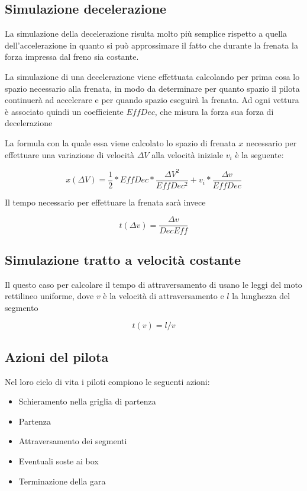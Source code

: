\documentclass[a4paper,11pt, twoside]{book}
\begin{document}
      \subsection{Simulazione decelerazione}
	La simulazione della decelerazione risulta molto più semplice rispetto a quella dell'accelerazione in quanto
	si può approssimare il fatto che durante la frenata la forza impressa dal freno sia costante.
	
        La simulazione di una decelerazione viene effettuata calcolando per prima cosa lo spazio necessario alla frenata,
	in modo da determinare per quanto spazio il pilota continuerà ad accelerare e per quando spazio 
	eseguirà la frenata. Ad ogni vettura è associato quindi
	un coefficiente $EffDec$, che misura la forza sua forza di decelerazione
	
	La formula con la quale essa viene calcolato lo spazio di frenata $x$ necessario per effettuare una variazione 
	di velocità $\Delta V$ alla velocità iniziale $v_i$ è la seguente:
	
	$$x(\Delta V)=\frac{1}{2}*EffDec*\frac{\Delta V^2}{EffDec^2}+v_i*\frac{\Delta v}{EffDec}$$
	
	Il tempo necessario per effettuare la frenata sarà invece
	
	$$t(\Delta v) = \frac{\Delta v}{DecEff}$$

		
      \subsection{Simulazione tratto a velocità costante}
        
        Il questo caso per calcolare il tempo di attraversamento di usano le leggi del moto rettilineo uniforme,
	dove $v$ è la velocità di attraversamento e $l$ la lunghezza del segmento
	
	$$t(v)=l/v$$
	
      \subsection{Azioni del pilota}
      \label{Azioni del pilota}
        Nel loro ciclo di vita i piloti compiono le seguenti azioni:
	
	\begin{itemize}
	  \item Schieramento nella griglia di partenza
	  \item Partenza
	  \item Attraversamento dei segmenti
	  \item Eventuali soste ai box
	  \item Terminazione della gara
	\end{itemize}
	
\end{document}
